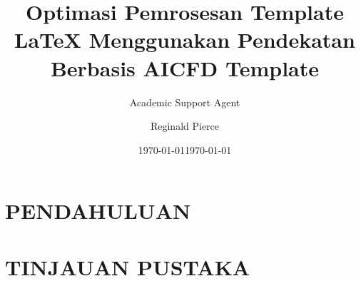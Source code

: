 \documentclass{article}
\title{Optimasi Pemrosesan Template LaTeX Menggunakan Pendekatan Berbasis AI}
\author{Academic Support Agent}
\date{\today}
\begin{document}
\maketitle

\begin{abstract}

\end{abstract}

\chapter{PENDAHULUAN}


\chapter{TINJAUAN PUSTAKA}



\usepackage[english]{babel}
\usepackage[utf8x]{inputenc}
\usepackage{amsmath}
\usepackage{graphicx}
\usepackage[colorinlistoftodos]{todonotes}

\usepackage{siunitx}
\usepackage{booktabs}
\usepackage{subcaption}
\usepackage[section]{placeins}

\usepackage{tikz}
\usetikzlibrary{patterns}

\usepackage[margin=1in]{geometry}

\setlength{\parindent}{0cm}

\title{CFD Template}

\author{Reginald Pierce}

\date{\today}
\end{document}
